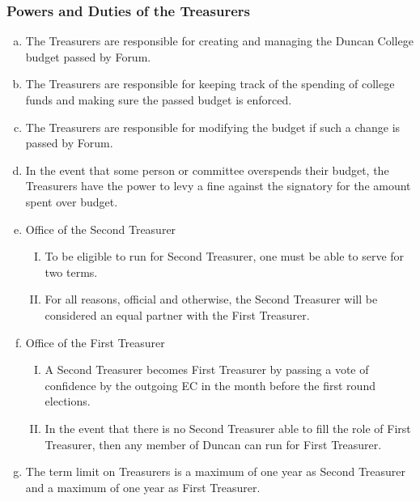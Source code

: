 \documentclass[USletter,12pt]{article}
\begin{document}
\subsubsection{Powers and Duties of the Treasurers}
\begin{enumerate}[(a)]
\item The Treasurers are responsible for creating and managing the Duncan College budget passed by Forum.
\item The Treasurers are responsible for keeping track of the spending of college funds and making sure the passed budget is enforced.
\item The Treasurers are responsible for modifying the budget if such a change is passed by Forum.
\item In the event that some person or committee overspends their budget, the Treasurers have the power to levy a fine against the signatory for the amount spent over budget.  
\item Office of the Second Treasurer
	\begin{enumerate}[(I)]
	\item To be eligible to run for Second Treasurer, one must be able to serve for two terms.
	\item For all reasons, official and otherwise, the Second Treasurer will be considered an equal partner with the First Treasurer.
	\end{enumerate}
\item Office of the First Treasurer
	\begin{enumerate}[(I)]
	\item A Second Treasurer becomes First Treasurer by passing a vote of confidence by the outgoing EC in the month before the first round elections.
	\item In the event that there is no Second Treasurer able to fill the role of First Treasurer, then any member of Duncan can run for First Treasurer.
	\end{enumerate}
\item The term limit on Treasurers is a maximum of one year as Second Treasurer and a maximum of one year as First Treasurer. 
\end{enumerate}
\end{document}
